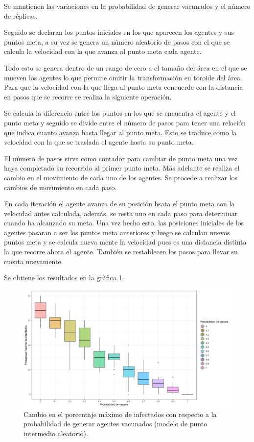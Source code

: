 \documentclass{article}
\begin{document}
Se mantienen las variaciones en la probabilidad de generar vacunados y el número de réplicas.

Seguido se declaran los puntos iniciales en los que aparecen los agentes y sus puntos meta, a su vez se genera un número aleatorio de pasos con el que se calcula la velocidad con la que avanza al punto meta cada agente.

Todo esto se genera dentro de un rango de cero a el tamaño del área en el que se mueven los agentes lo que permite omitir la transformación en toroide del área.
Para que la velocidad con la que llega al punto meta concuerde con la distancia en pasos que se recorre se realiza la siguiente operación.

Se calcula la diferencia entre los puntos en los que se encuentra el agente y el punto meta y seguido se divide entre el número de pasos para tener una relación que indica cuanto avanza hasta llegar al punto meta.
Esto se traduce como la velocidad con la que se traslada el agente hasta su punto meta.

El número de pasos sirve como contador para cambiar de punto meta una vez haya completado su recorrido al primer punto meta.
Más adelante se realiza el cambio en el movimiento de cada uno de los agentes.
Se procede a realizar los cambios de movimiento en cada paso.

En cada iteración el agente avanza de su posición hsata el punto meta con la velocidad antes calculada, además, se resta uno en cada paso para determinar cuando ha alcanzado su meta.
Una vez hecho esto, las posiciones iniciales de los agentes pasaran a ser los puntos meta anteriores y luego se calculan nuevos puntos meta y se calcula nueva mente la velocidad pues es una distancia distinta la que recorre ahora el agente. También se restablecen los pasos para llevar su cuenta nuevamente.

Se obtiene los resultados en la gráfica \ref{g2}.
\begin{figure}[H]
\centering
\includegraphics[width = 187 mm]{Grafica2p6.png}
\caption{Cambio en el porcentaje máximo de infectados con respecto a la probabilidad de generar agentes vacunados (modelo de punto intermedio aleatorio).}
\label{g2}
\end{figure}
\end{document}
